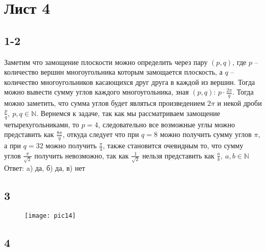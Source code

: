 \newpage		
	\section*{Лист 4}
		\subsection*{1-2}
		\noindent
		Заметим что замощение плоскости можно определить через пару $(p,q)$, где $p$ -- количество вершин многоугольника которым замощается плоскость, а $q$ -- количество многоугольников касающихся друг друга в каждой из вершин.
		\vskip 0.1in
		\noindent
		Тогда можно вывести сумму углов каждого многоугольника, зная $(p,q)$: $p \cdot \frac{2 \pi}{q}$. Тогда можно заметить, что сумма углов будет являться произведением $2\pi$ и некой дроби $\frac{p}{q},\ p,q \in \mathbb{N}$.
		\vskip 0.1in
		\noindent
		Вернемся к задаче, так как мы рассматриваем замощение четырехугольниками, то $p = 4$, следовательно все возможные углы можно представить как $\frac{8\pi}{q}$, откуда следует что при $q = 8$ можно получить сумму углов $\pi$, а при $q=32$ можно получить $\frac{\pi}{4}$, также становится очевидным то, что сумму углов $\frac{\pi}{\sqrt{2}}$ получить невозможно, так как $\frac{1}{\sqrt{2}}$ нельзя представить как $\frac{a}{b},\ a,b \in \mathbb{N}$\\
		Ответ: a) да, б) да, в) нет
		\begin{figure}[h!]
			\begin{minipage}[h]{0.5\linewidth}
			\end{minipage}
			\hfill
			\begin{minipage}[h]{0.5\linewidth}
			\end{minipage}
		\end{figure}
		
		
		\subsection*{3}
		\begin{figure}[h!]
			\center\texttt{[image: pic14]}
		\end{figure}
		
		\subsection*{4}